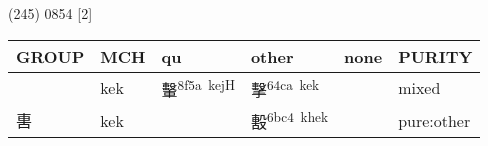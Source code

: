 \documentclass[14pt,a4paper]{scrartcl}
\begin{document}
(245) 0854 {[}2{]}

\begin{longtable}[c]{@{}llllll@{}}
\toprule
\begin{minipage}[b]{0.14\columnwidth}\raggedright\strut
GROUP
\strut\end{minipage} &
\begin{minipage}[b]{0.14\columnwidth}\raggedright\strut
MCH
\strut\end{minipage} &
\begin{minipage}[b]{0.14\columnwidth}\raggedright\strut
qu
\strut\end{minipage} &
\begin{minipage}[b]{0.14\columnwidth}\raggedright\strut
other
\strut\end{minipage} &
\begin{minipage}[b]{0.14\columnwidth}\raggedright\strut
none
\strut\end{minipage} &
\begin{minipage}[b]{0.14\columnwidth}\raggedright\strut
PURITY
\strut\end{minipage}\tabularnewline
\midrule
\endhead
\begin{minipage}[t]{0.14\columnwidth}\raggedright\strut
𣪠
\strut\end{minipage} &
\begin{minipage}[t]{0.14\columnwidth}\raggedright\strut
kek
\strut\end{minipage} &
\begin{minipage}[t]{0.14\columnwidth}\raggedright\strut
轚\textsuperscript{8f5a~kejH}
\strut\end{minipage} &
\begin{minipage}[t]{0.14\columnwidth}\raggedright\strut
擊\textsuperscript{64ca~kek}
\strut\end{minipage} &
\begin{minipage}[t]{0.14\columnwidth}\raggedright\strut
\strut\end{minipage} &
\begin{minipage}[t]{0.14\columnwidth}\raggedright\strut
mixed
\strut\end{minipage}\tabularnewline
\begin{minipage}[t]{0.14\columnwidth}\raggedright\strut
軎
\strut\end{minipage} &
\begin{minipage}[t]{0.14\columnwidth}\raggedright\strut
kek
\strut\end{minipage} &
\begin{minipage}[t]{0.14\columnwidth}\raggedright\strut
\strut\end{minipage} &
\begin{minipage}[t]{0.14\columnwidth}\raggedright\strut
毄\textsuperscript{6bc4~khek}
\strut\end{minipage} &
\begin{minipage}[t]{0.14\columnwidth}\raggedright\strut
\strut\end{minipage} &
\begin{minipage}[t]{0.14\columnwidth}\raggedright\strut
pure:other
\strut\end{minipage}\tabularnewline
\bottomrule
\end{longtable}
\end{document}
